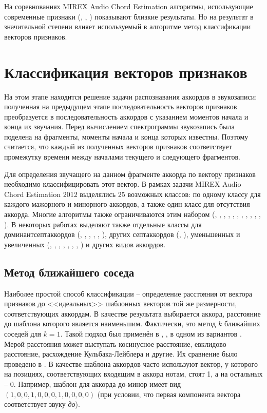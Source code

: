 На соревнованиях MIREX Audio Chord Estimation алгоритмы, использующие
современные признаки (\cite{Khadkevich2011}, \cite{Mauch2010},
\cite{Mueller2009}) показывают близкие результаты. Но на результат в
значительной степени влияет используемый в алгоритме метод классификации
векторов признаков.

\section{Классификация векторов признаков} \label{sectL_post}

На этом этапе находится решение задачи распознавания аккордов в звукозаписи:
полученная на предыдущем этапе последовательность векторов признаков
преобразуется в последовательность аккордов с указанием моментов начала и конца
их звучания. Перед вычислением спектрограммы звукозапись была поделена на
фрагменты, моменты начала и конца которых известны. Поэтому считается, что
каждый из полученных векторов признаков соответствует промежутку времени между
началами текущего и следующего фрагментов.

Для определения звучащего на данном фрагменте аккорда по вектору признаков
необходимо классифицировать этот вектор. В рамках задачи MIREX Audio Chord
Estimation 2012 выделялись 25 возможных классов: по одному классу для каждого
мажорного и минорного аккордов, а также один класс для отсутствия аккорда.
Многие алгоритмы также ограничиваются этим набором (\cite{Bello2005},
\cite{Lee2006}, \cite{Khadkevich2009}, \cite{Oudre2009}, \cite{Weller2009},
\cite{Cho2010}, \cite{Rocher2010}, \cite{Cho2011}, \cite{Jiang2011},
\cite{Ni2011}, \cite{Chen2012}, \cite{Humphrey2012}). В некоторых работах
выделяют также отдельные классы для доминантсептаккордов (\cite{Sheh2003},
\cite{Mauch2008}, \cite{Zhang2008}, \cite{Mauch2009}, \cite{Mauch2010},
\cite{DeHaas2012}), других септаккордов (\cite{Sheh2003}, \cite{Mauch2010}),
уменьшенных и увеличенных (\cite{Sheh2003}, \cite{Burgoyne2007},
\cite{Lee2008}, \cite{Mauch2008}, \cite{Sumi2008}, \cite{Mauch2009},
\cite{Mauch2010}, \cite{Ni2012}) и других видов аккордов.

\subsection{Метод ближайшего соседа} \label{ssectL_nn}

Наиболее простой способ классификации -- определение расстояния от вектора
признаков до <<идеальных>> шаблонных векторов той же размерности,
соответствующих аккордам. В качестве результата выбирается аккорд, расстояние до
шаблона которого является наименьшим. Фактически, это метод $k$ ближайших
соседей для $k=1$. Такой подход был применён в \cite{Lee2006}, \cite{Oudre2009},
в одном из вариантов \cite{Jiang2011}. Мерой расстояния может выступать
косинусное расстояние, евклидово расстояние, расхождение Кульбака-Лейблера и
другие. Их сравнение было проведено в \cite{Oudre2009}. В качестве шаблона
аккордов часто используют вектор, у которого на позициях, соответствующих
входящим в аккорд нотам, стоят 1, а на остальных -- 0. Например, шаблон для
аккорда до-минор имеет вид $(1,0,0,1,0,0,0,1,0,0,0,0)$ (при условии, что первая
компонента вектора соответствует звуку \emph{до}).

